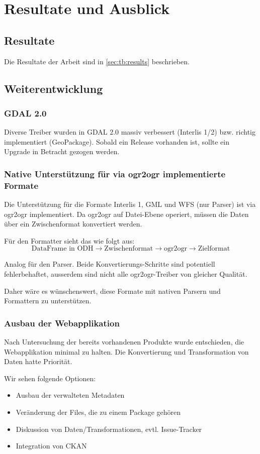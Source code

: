 \chapter{Resultate und Ausblick}

\section{Resultate}
Die Resultate der Arbeit sind in \vref{sec:tb:results} beschrieben.

\section{Weiterentwicklung} \label{sec:tb:further-dev}

\subsection{GDAL 2.0}
Diverse Treiber wurden in GDAL 2.0 massiv verbessert (Interlis 1/2) bzw. richtig implementiert (GeoPackage). Sobald ein Release vorhanden ist, sollte ein Upgrade in Betracht gezogen werden.

\subsection{Native Unterstützung für via ogr2ogr implementierte Formate}
Die Unterstützung für die Formate Interlis 1, GML und WFS (nur Parser) ist via ogr2ogr implementiert. Da ogr2ogr auf Datei-Ebene operiert, müssen die Daten über ein Zwischenformat konvertiert werden.

Für den Formatter sieht das wie folgt aus:
$$ \text{DataFrame in ODH} \to \text{Zwischenformat} \to \text{ogr2ogr} \to \text{Zielformat} $$

Analog für den Parser. Beide Konvertierungs-Schritte sind potentiell fehlerbehaftet, ausserdem sind nicht alle ogr2ogr-Treiber von gleicher Qualität.

Daher wäre es wünschenswert, diese Formate mit nativen Parsern und Formattern zu unterstützen. 

\subsection{Ausbau der Webapplikation}
Nach Untersuchung der bereits vorhandenen Produkte wurde entschieden, die Webapplikation minimal zu halten. Die Konvertierung und Transformation von Daten hatte Priorität.

Wir sehen folgende Optionen:
\begin{itemize}
\item Ausbau der verwalteten Metadaten
\item Veränderung der Files, die zu einem Package gehören
\item Diskussion von Daten/Transformationen, evtl. Issue-Tracker
\item Integration von CKAN
\end{itemize}


